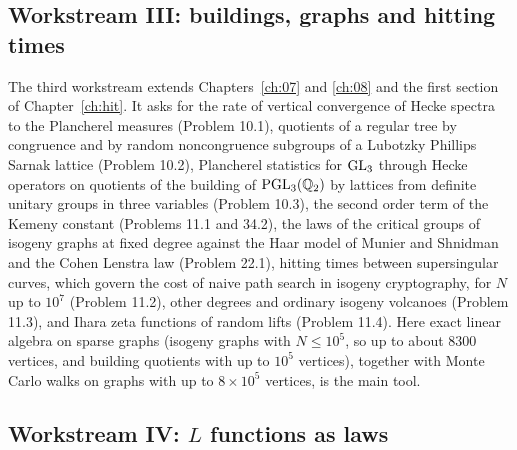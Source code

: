 \subsection{Workstream III: buildings, graphs and hitting times}

The third workstream extends Chapters~\ref{ch:07} and \ref{ch:08} and the first section of Chapter~\ref{ch:hit}. It asks for the rate of vertical convergence of Hecke spectra to the Plancherel measures (Problem 10.1), quotients of a regular tree by congruence and by random noncongruence subgroups of a Lubotzky Phillips Sarnak lattice (Problem 10.2), Plancherel statistics for $\mathrm{GL}_3$ through Hecke operators on quotients of the building of $\mathrm{PGL}_3(\mathbb{Q}_2)$ by lattices from definite unitary groups in three variables (Problem 10.3), the second order term of the Kemeny constant (Problems 11.1 and 34.2), the laws of the critical groups of isogeny graphs at fixed degree against the Haar model of Munier and Shnidman and the Cohen Lenstra law (Problem 22.1), hitting times between supersingular curves, which govern the cost of naive path search in isogeny cryptography, for $N$ up to $10^7$ (Problem 11.2), other degrees and ordinary isogeny volcanoes (Problem 11.3), and Ihara zeta functions of random lifts (Problem 11.4). Here exact linear algebra on sparse graphs (isogeny graphs with $N\le10^5$, so up to about $8300$ vertices, and building quotients with up to $10^5$ vertices), together with Monte Carlo walks on graphs with up to $8\times10^5$ vertices, is the main tool.

\subsection{Workstream IV: \texorpdfstring{$L$}{L} functions as laws}

